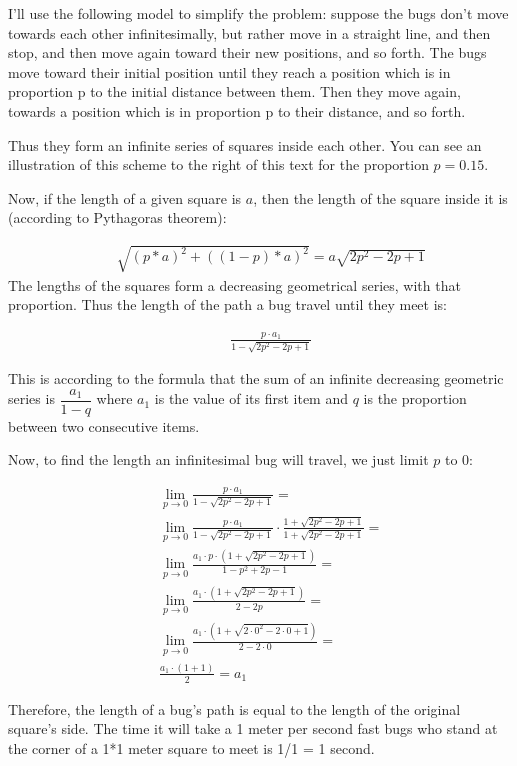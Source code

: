 \documentclass[a4paper]{article}
\begin{document}
I'll use the following model to simplify the problem: suppose the bugs don't
move towards each other infinitesimally, but rather move in a straight line, and
then stop, and then move again toward their new positions, and so forth. The
bugs move toward their initial position until they reach a position which is in
proportion p to the initial distance between them. Then they move again,
towards a position which is in proportion p to their distance, and so forth.

Thus they form an infinite series of squares inside each other. You can see an
illustration of this scheme to the right of this text for the proportion
$ p=0.15 $.

Now, if the length of a given square is $a$, then the length of the square
inside it is (according to Pythagoras theorem):

\begin{eqnarray*}
& & \sqrt{\left(p*a\right)^2+\left(\left(1-p\right)*a\right)^2} =
a\sqrt{2p^2-2p+1}
\end{eqnarray*}
The lengths of the squares form a decreasing
geometrical series, with that proportion. Thus the length of the path a bug
travel until they meet is:

\begin{eqnarray*}
& & \frac{p \cdot a_1}{1 - \sqrt{2p^2-2p+1} }
\end{eqnarray*}

This is according to the formula that the sum of an infinite decreasing
geometric series is $\dfrac{a_1}{1-q}$ where $a_1$ is the value of its first item
and $q$ is the proportion between two consecutive items.

Now, to find the length an infinitesimal bug will travel, we just limit $p$ to
0:

\begin{eqnarray*}
& & \lim\limits_{p \to 0} \frac{p \cdot a_1}{1-\sqrt{2p^2-2p+1}} = \\
& & \lim\limits_{p \to 0} \frac{p \cdot a_1}{1-\sqrt{2p^2-2p+1}} \cdot
\frac{1+\sqrt{2p^2-2p+1}}{1+\sqrt{2p^2-2p+1}} = \\
& & \lim\limits_{p \to 0} \frac{a_1 \cdot p \cdot \left(1+\sqrt{2p^2-2p+1}\right)}{1-p^2+2p-1} = \\
& & \lim\limits_{p \to 0} \frac{a_1 \cdot \left(1+\sqrt{2p^2-2p+1}\right)}{2-2p} = \\
& & \lim\limits_{p \to 0} \frac{a_1 \cdot \left(1+\sqrt{2 \cdot 0^2-2 \cdot 0+1}\right)}{2-2 \cdot 0} = \\
& & \frac{a_1 \cdot (1+1)}{2} = a_1
\end{eqnarray*}

Therefore, the length of a bug's path is equal to the length of the original
square's side. The time it will take a 1 meter per second fast bugs who stand
at the corner of a 1*1 meter square to meet is 1/1 = 1 second.
\end{document}
